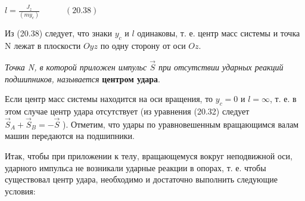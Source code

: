 {\begin{center}
\par $l = \frac{J_z}{(my_c)} \quad\quad\quad (20.38)$ 

\par Из (20.38) следует, что знаки $y_c$ и $l$ одинаковы, т. е. центр масс системы и точка N лежат в плоскости $Oyz$ по одну сторону от оси $Oz.$

\par \textit{Точка N, в которой приложен импульс $\vec{S}$ при отсутствии ударных реакций подшипников, называется} \textbf{центром удара}.

\par{}

\par Если центр масс системы находится на оси вращения, то $y_c=0$  и $l = ∞$, т. е. в этом случае центр  удара  отсутствует (из  уравнения (20.32)  следует $\vec{S}_A + \vec{S}_B = -\vec{S}$ ).  Отметим, что удары по уравновешенным вращающимся валам машин передаются на подшипники.

\par Итак, чтобы при приложении к телу, вращающемуся вокруг неподвижной оси, ударного импульса не возникали ударные реакции в опорах, т. е. чтобы существовал  центр  удара,  необходимо и  достаточно  выполнить  следующие условия:

\par{}
\end{center}
}
